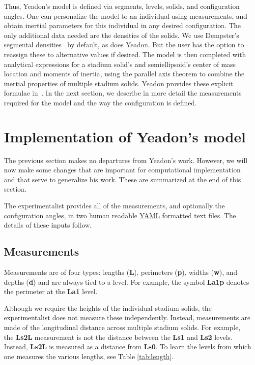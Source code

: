 \documentclass[10pt,a4paper,twocolumn]{article}
\begin{document}
Thus, Yeadon's model is defined via segments, levels, solids, and configuration
angles. One can personalize the model to an individual using measurements, and
obtain inertial parameters for this individual in any desired configuration. The only
additional data needed are the densities of the
solids. We use Dempster's segmental densities~\cite{Dempster1955} by
default, as does Yeadon. But the user has the option to reassign these to
alternative values if desired. The model is then completed with analytical
expressions for a stadium solid's and semiellipsoid's center of mass location and
moments of inertia, using the parallel axis theorem to combine the inertial
properties of multiple stadium solids. Yeadon provides these explicit formulae
in~\cite{Yeadon1990f}. In the next section, we describe in more detail the
measurements required for the model and the way the configuration is defined.

\section*{Implementation of Yeadon's model}

The previous section makes no departures from Yeadon's work. However, we will
now make some changes that are important for computational
implementation and that serve to generalize his work. These are
summarized at the end of this section.

The experimentalist provides all of the measurements, and
optionally the configuration angles, in two human readable \href{http://yaml.org}{YAML}
formatted text files. The details of these inputs follow.

\subsection*{Measurements}

Measurements are of four types: lengths (\textbf{L}), perimeters
(\textbf{p}), widths (\textbf{w}), and depths (\textbf{d}) and are
always tied to a level. For example, the symbol \textbf{La1p} denotes the
perimeter at the \textbf{La1} level.

Although we require the heights of the individual stadium solids, the
experimentalist does not measure these independently. Instead, measurements are made of the longitudinal distance across multiple stadium
solids. For example, the \textbf{Ls2L} measurement is not the distance between
the \textbf{Ls1} and \textbf{Ls2} levels. Instead, \textbf{Ls2L} is measured
as a distance from \textbf{Ls0}. To learn the levels from which one measures the various
lengths, see Table \ref{tab:length}.
\end{document}

